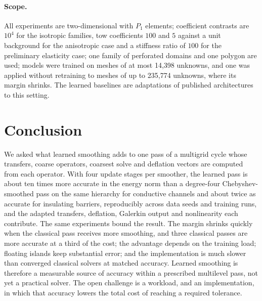 \paragraph{Scope.} All experiments are two-dimensional with $P_1$ elements; coefficient contrasts are $10^4$ for the
isotropic families, tow coefficients $100$ and $5$ against a unit background for the anisotropic case and a stiffness ratio
of $100$ for the preliminary elasticity case; one family of perforated domains and one polygon are used; models were trained
on meshes of at most 14{,}398 unknowns, and one was applied without retraining to meshes of up to 235{,}774 unknowns, where its
margin shrinks. The learned baselines are adaptations of published architectures to this setting.

\section{Conclusion}\label{sec:conclusion}
We asked what learned smoothing adds to one pass of a multigrid cycle whose transfers, coarse operators, coarsest solve and
deflation vectors are computed from each operator. With four update stages per smoother, the learned pass is about ten times
more accurate in the energy norm than a degree-four Chebyshev-smoothed pass on the same hierarchy for conductive channels and
about twice as accurate for insulating barriers, reproducibly across data seeds and training runs, and the adapted transfers,
deflation, Galerkin output and nonlinearity each contribute. The same experiments bound the result. The margin shrinks quickly
when the classical pass receives more smoothing, and three classical passes are more accurate at a third of the cost; the advantage
depends on the training load; floating islands keep substantial error; and the implementation is much slower than converged
classical solvers at matched accuracy. Learned smoothing is therefore a measurable source of accuracy within a prescribed
multilevel pass, not yet a practical solver. The open challenge is a workload, and an implementation, in which that accuracy
lowers the total cost of reaching a required tolerance.
